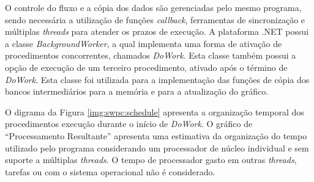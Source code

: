 \begin{figure}[h]
			\end{figure}

			O controle do fluxo e a cópia dos dados são gerenciadas pelo mesmo programa, sendo necessária a utilização de funções \textit{callback}, ferramentas de sincronização e múltiplas \textit{threads} para atender os prazos de execução. A plataforma .NET possui a classe \textit{BackgroundWorker}, a qual implementa uma forma de ativação de procedimentos concorrentes, chamados \textit{DoWork}. Esta classe também possui a opção de execução de um terceiro procedimento, ativado após o término de \textit{DoWork}. Esta classe foi utilizada para a implementação das funções de cópia dos bancos intermediários para a memória e para a atualização do gráfico.

			O digrama da Figura \ref{img:swpc:schedule} apresenta a organização temporal dos procedimentos execução durante o início de \textit{DoWork}. O gráfico de ``Processamento Resultante'' apresenta uma estimativa da organização do tempo utilizado pelo programa considerando um processador de núcleo individual e sem suporte a múltiplas \textit{threads}. O tempo de processador gasto em outras \textit{threads}, tarefas ou com o sistema operacional não é considerado.

